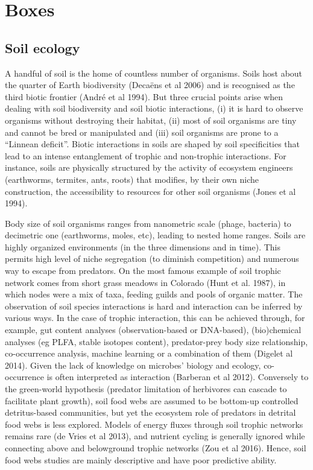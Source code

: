 

\section*{Boxes}\label{potential-boxes}

\subsection*{Soil ecology}\label{soil-ecology}

A handful of soil is the home of countless number of organisms. Soils host about
the quarter of Earth biodiversity (Decaëns et al 2006) and is recognised as the
third biotic frontier (André et al 1994). But three crucial points arise when
dealing with soil biodiversity and soil biotic interactions, (i) it is hard to
observe organisms without destroying their habitat, (ii) most of soil organisms
are tiny and cannot be bred or manipulated and (iii) soil organisms are prone to
a “Linnean deficit”. Biotic interactions in soils are shaped by soil
specificities that lead to an intense entanglement of trophic and non-trophic
interactions. For instance, soils are physically structured by the activity of
ecosystem engineers (earthworms, termites, ants, roots) that modifies, by their
own niche construction, the accessibility to resources for other soil organisms
(Jones et al 1994).

Body size of soil organisms ranges from nanometric scale (phage, bacteria) to
decimetric one (earthworms, moles, etc), leading to nested home ranges. Soils
are highly organized environments (in the three dimensions and in time). This
permits high level of niche segregation (to diminish competition) and numerous
way to escape from predators. On the most famous example of soil trophic network
comes from short grass meadows in Colorado (Hunt et al. 1987), in which nodes
were a mix of taxa, feeding guilds and pools of organic matter. The observation
of soil species interactions is hard and interaction can be inferred by various
ways. In the case of trophic interaction, this can be achieved through, for
example, gut content analyses (observation-based or DNA-based), (bio)chemical
analyses (eg PLFA, stable isotopes content), predator-prey body size
relationship, co-occurrence analysis, machine learning or a combination of them
(Digelet al 2014). Given the lack of knowledge on microbes’ biology and ecology,
co-occurrence is often interpreted as interaction (Barberan et al 2012).
Conversely to the green-world hypothesis (predator limitation of herbivores can
cascade to facilitate plant growth), soil food webs are assumed to be bottom-up
controlled detritus-based communities, but yet the ecosystem role of predators
in detrital food webs is less explored. Models of energy fluxes through soil
trophic networks remains rare (de Vries et al 2013), and nutrient cycling is
generally ignored while connecting above and belowground trophic networks (Zou
et al 2016). Hence, soil food webs studies are mainly descriptive and have poor
predictive ability.

